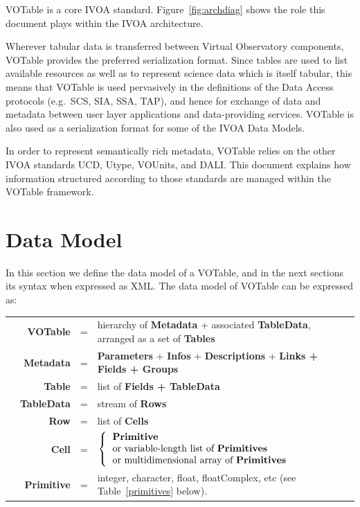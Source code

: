 \documentclass[11pt,a4paper]{ivoa}
\def\Tref#1{Table~\ref{#1}}
\def\Fref#1{Figure~\ref{#1}}
\let\fg=\color
\begin{document}
VOTable is a core IVOA standard.
\Fref{fig:archdiag} shows the role this document plays within the IVOA architecture.

Wherever tabular data is transferred between Virtual Observatory components,
VOTable provides the preferred serialization format.
Since tables are used to list available resources as well as to
represent science data which is itself tabular,
this means that VOTable is used pervasively in the definitions
of the Data Access protocols (e.g.\ SCS, SIA, SSA, TAP),
and hence for exchange of data and metadata
between user layer applications and data-providing services.
VOTable is also used as a serialization format for
some of the IVOA Data Models.

In order to represent semantically rich metadata, VOTable relies on
the other IVOA standards UCD, Utype, VOUnits, and DALI.
This document explains how information structured according to those
standards are managed within the VOTable framework.


\section{Data Model}

In this section we define the data model of a VOTable, and in the
next sections its syntax when expressed as XML. The data model of
VOTable can be expressed as:

\medskip
\begin{tabular}{rrcp{}}
\hspace{3em}&{\bf VOTable} &=& hierarchy of {\bf Metadata} + associated
        {\bf TableData}, arranged as a set of {\bf Tables}\\
&{\bf Metadata} &=& {\bf Parameters} + {\bf Infos} + {\bf Descriptions}
                + {\bf {\fg{black}Links + Fields + Groups}}\\
&{\bf Table} &=& list of {\bf Fields + TableData}\\
&{\bf TableData}{ } &=& stream of {\bf Rows}\\
&{\bf Row} &=& list of {\bf Cells}\\
&{\bf Cell} &=&
        $\left\{
        \begin{tabular}{l}
         {\bf Primitive} \\
        or variable-length list of {\bf Primitives} \\
        or multidimensional array of {\bf Primitives}\\
        \end{tabular}
        \right.$
        \\
&{\bf Primitive} &=& integer, character, float, floatComplex, etc
(see \Tref{primitives} below).
\end{tabular}
\end{document}
